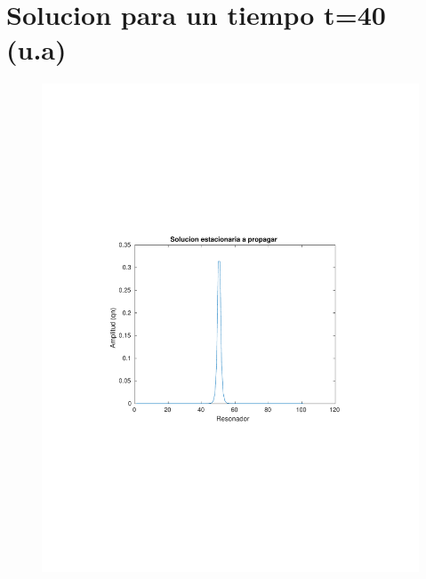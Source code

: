 \documentclass[10pt,a4paper]{article}
\author{M.Sabogal}
\begin{document}
\section{Solucion para un tiempo t=40 (u.a)}
\begin{figure}[h!]
\centering 
\includegraphics[scale=0.8]{SE2.pdf}
\end{figure}
\end{document}
